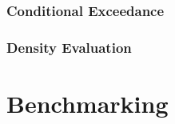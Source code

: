 \documentclass{beamer}
\begin{document}
\begin{frame}
  \frametitle{Conditional Exceedance}
\end{frame}

\begin{frame}
  \frametitle{Density Evaluation}
\end{frame}


\section{Benchmarking}
\end{document}
